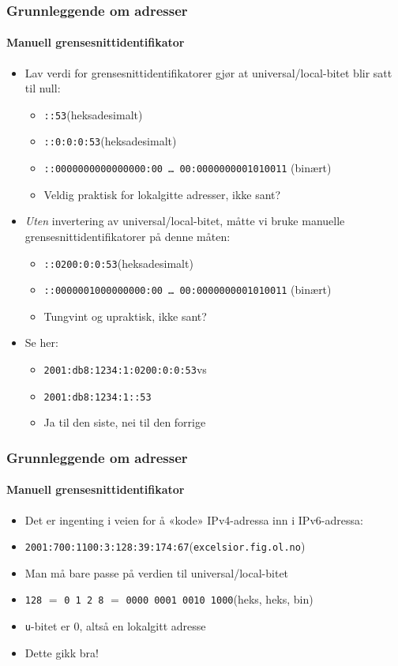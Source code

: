 \begin{frame}%
  \frametitle{Grunnleggende om adresser}
  \framesubtitle{Manuell grensesnittidentifikator}
  \begin{itemize}[<+->]
  \item Lav verdi for grensesnittidentifikatorer gjør at
    universal/local-bitet blir satt til null:
    \begin{itemize}[<+->]
    \item \texttt{::53}\hfill(heksadesimalt)
    \item \texttt{::\alert{0}:0:0:53}\hfill(heksadesimalt)
    \item \texttt{::000000\alert{0}000000000:00~\dots~00:0000000001010011}
      \hfill(binært)
    \item Veldig praktisk for lokalgitte adresser, ikke sant?
    \end{itemize}
  \item \textit{Uten\/} invertering av universal/local-bitet, måtte vi
    bruke manuelle grensesnittidentifikatorer på denne måten:
    \begin{itemize}[<+->]
    \item \texttt{::0\alert{2}00:0:0:53}\hfill(heksadesimalt)
    \item \texttt{::000000\alert{1}000000000:00~\dots~00:0000000001010011}
      \hfill(binært)
    \item Tungvint og upraktisk, ikke sant?
    \end{itemize}
  \item Se her:
    \begin{itemize}[<+->]
    \item \texttt{2001:db8:1234:1:0200:0:0:53}\quad vs
    \item \texttt{2001:db8:1234:1::53}
    \item Ja til den siste, nei til den forrige
    \end{itemize}
  \end{itemize}
\end{frame}

\begin{frame}%
  \frametitle{Grunnleggende om adresser}
  \framesubtitle{Manuell grensesnittidentifikator}
  \begin{itemize}[<+->]
  \item Det er ingenting i veien for å «kode» IPv4-adressa inn i
    IPv6-adressa:
  \item \texttt{2001:700:1100:3:\alert{128:39:174:67}}\hfill(\texttt{excelsior.fig.ol.no})
  \item Man må bare passe på verdien til universal/local-bitet
  \item \texttt{128} \(=\) \texttt{0 1 2 8} \(=\) \texttt{0000 00\alert{0}1 0010 1000}\hfill(heks, heks, bin)
  \item \texttt{u}-bitet er \(0\), altså en lokalgitt adresse
  \item Dette gikk bra!
  \end{itemize}
\end{frame}

